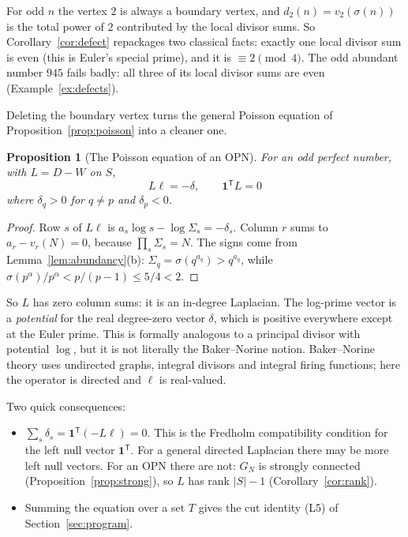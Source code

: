 \documentclass[11pt]{article}
\newtheorem{proposition}[theorem]{Proposition}
\theoremstyle{definition}
\theoremstyle{remark}
\newcommand{\one}{\mathbf{1}}
\begin{document}
For odd $n$ the vertex $2$ is always a boundary vertex, and
$d_2(n)=v_2(\sigma(n))$ is the total power of $2$ contributed by the local
divisor sums.  So Corollary~\ref{cor:defect} repackages two classical facts:
exactly one local divisor sum is even (this is Euler's special prime), and it
is $\equiv2\pmod 4$.  The odd abundant number $945$ fails badly: all three of
its local divisor sums are even (Example~\ref{ex:defects}).

Deleting the boundary vertex turns the general Poisson equation of
Proposition~\ref{prop:poisson} into a cleaner one.

\begin{proposition}[The Poisson equation of an OPN]\label{prop:poissonOPN}
For an odd perfect number, with $L=D-W$ on $S$,
\[
\boxed{\;L\ell=-\delta,\qquad \one^{\mathsf T}L=0\;}
\]
where $\delta_q>0$ for $q\ne p$ and $\delta_p<0$.
\end{proposition}

\begin{proof}
Row $s$ of $L\ell$ is $a_s\log s-\log\Sigma_s=-\delta_s$.  Column $r$ sums to
$a_r-v_r(N)=0$, because $\prod_s\Sigma_s=N$.  The signs come from
Lemma~\ref{lem:abundancy}(b): $\Sigma_q=\sigma(q^{a_q})>q^{a_q}$, while
$\sigma(p^\alpha)/p^\alpha<p/(p-1)\le5/4<2$.
\end{proof}

So $L$ has zero column sums: it is an in-degree Laplacian.  The log-prime
vector is a \emph{potential} for the real degree-zero vector $\delta$, which
is positive everywhere except at the Euler prime.  This is formally analogous
to a principal divisor with potential $\log$, but it is not literally the
Baker--Norine notion.  Baker--Norine theory uses undirected graphs,
integral divisors and integral firing functions; here the operator is
directed and $\ell$ is real-valued.

Two quick consequences:
\begin{itemize}[leftmargin=1.5em]
\item $\sum_s\delta_s=\one^{\mathsf T}(-L\ell)=0$.  This is the Fredholm
  compatibility condition for the left null vector $\one^{\mathsf T}$.  For
  a general directed Laplacian there may be more left null vectors.  For an
  OPN there are not: $G_N$ is strongly connected
  (Proposition~\ref{prop:strong}), so $L$ has rank $|S|-1$
  (Corollary~\ref{cor:rank}).
\item Summing the equation over a set $T$ gives the cut identity (L5) of
  Section~\ref{sec:program}.
\end{itemize}
\end{document}
